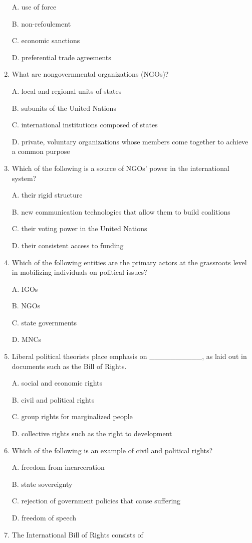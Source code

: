\documentclass[
]{book}
\begin{document}
\begin{enumerate}
  A. use of force

  B. non-refoulement

  C. economic sanctions

  D. preferential trade agreements
\item
  What are nongovernmental organizations (NGOs)?

  A. local and regional units of states

  B. subunits of the United Nations

  C. international institutions composed of states

  D. private, voluntary organizations whose members come together to achieve a common purpose
\item
  Which of the following is a source of NGOs' power in the international system?

  A. their rigid structure

  B. new communication technologies that allow them to build coalitions

  C. their voting power in the United Nations

  D. their consistent access to funding
\item
  Which of the following entities are the primary actors at the grassroots level in mobilizing individuals on political issues?

  A. IGOs

  B. NGOs

  C. state governments

  D. MNCs
\item
  Liberal political theorists place emphasis on \_\_\_\_\_\_\_\_\_\_, as laid out in documents such as the Bill of Rights.

  A. social and economic rights

  B. civil and political rights

  C. group rights for marginalized people

  D. collective rights such as the right to development
\item
  Which of the following is an example of civil and political rights?

  A. freedom from incarceration

  B. state sovereignty

  C. rejection of government policies that cause suffering

  D. freedom of speech
\item
  The International Bill of Rights consists of


\end{enumerate}
\end{document}
